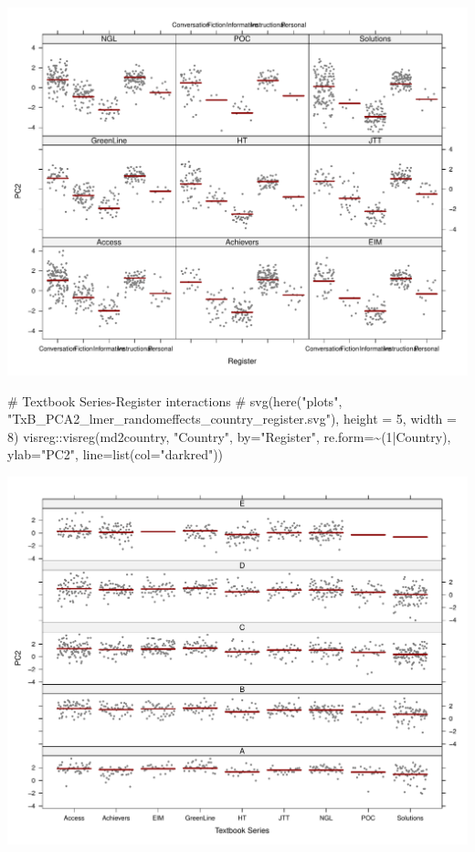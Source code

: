 \documentclass[
  letterpaper,
  DIV=11,
  numbers=noendperiod]{scrreprt}
\newenvironment{Shaded}{\begin{snugshade}}{\end{snugshade}}
\newcommand{\AttributeTok}[1]{\textcolor[rgb]{0.40,0.45,0.13}{#1}}
\newcommand{\CommentTok}[1]{\textcolor[rgb]{0.37,0.37,0.37}{#1}}
\newcommand{\DecValTok}[1]{\textcolor[rgb]{0.68,0.00,0.00}{#1}}
\newcommand{\FunctionTok}[1]{\textcolor[rgb]{0.28,0.35,0.67}{#1}}
\newcommand{\NormalTok}[1]{\textcolor[rgb]{0.00,0.23,0.31}{#1}}
\newcommand{\SpecialCharTok}[1]{\textcolor[rgb]{0.37,0.37,0.37}{#1}}
\newcommand{\StringTok}[1]{\textcolor[rgb]{0.13,0.47,0.30}{#1}}
\begin{document}
\includegraphics{AppendixF_files/figure-pdf/Dim2estimateplots-2.pdf}

\begin{Shaded}
\begin{Highlighting}[]
\CommentTok{\# Textbook Series{-}Register interactions}
\CommentTok{\# svg(here("plots", "TxB\_PCA2\_lmer\_randomeffects\_country\_register.svg"), height = 5, width = 8)}
\NormalTok{visreg}\SpecialCharTok{::}\FunctionTok{visreg}\NormalTok{(md2country, }\StringTok{"Country"}\NormalTok{, }\AttributeTok{by=}\StringTok{"Register"}\NormalTok{, }\AttributeTok{re.form=}\SpecialCharTok{\textasciitilde{}}\NormalTok{(}\DecValTok{1}\SpecialCharTok{|}\NormalTok{Country),}
               \AttributeTok{ylab=}\StringTok{"PC2"}\NormalTok{, }\AttributeTok{line=}\FunctionTok{list}\NormalTok{(}\AttributeTok{col=}\StringTok{"darkred"}\NormalTok{))}
\end{Highlighting}
\end{Shaded}

\includegraphics{AppendixF_files/figure-pdf/Dim2estimateplots-3.pdf}
\end{document}
